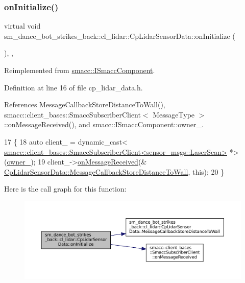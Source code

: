 \subsubsection{\texorpdfstring{on\+Initialize()}{onInitialize()}}
{\footnotesize\ttfamily virtual void sm\+\_\+dance\+\_\+bot\+\_\+strikes\+\_\+back\+::cl\+\_\+lidar\+::\+Cp\+Lidar\+Sensor\+Data\+::on\+Initialize (\begin{DoxyParamCaption}{ }\end{DoxyParamCaption})\hspace{0.3cm}{\ttfamily [inline]}, {\ttfamily [override]}, {\ttfamily [virtual]}}



Reimplemented from \hyperlink{classsmacc_1_1ISmaccComponent_ae6f71d008db12553912e9436184b9e65}{smacc\+::\+I\+Smacc\+Component}.



Definition at line 16 of file cp\+\_\+lidar\+\_\+data.\+h.



References Message\+Callback\+Store\+Distance\+To\+Wall(), smacc\+::client\+\_\+bases\+::\+Smacc\+Subscriber\+Client$<$ Message\+Type $>$\+::on\+Message\+Received(), and smacc\+::\+I\+Smacc\+Component\+::owner\+\_\+.


\begin{DoxyCode}
17   \{
18     \textcolor{keyword}{auto} client\_ = \textcolor{keyword}{dynamic\_cast<}
      \hyperlink{classsmacc_1_1client__bases_1_1SmaccSubscriberClient}{smacc::client\_bases::SmaccSubscriberClient<sensor\_msgs::LaserScan>}
       *\textcolor{keyword}{>}(\hyperlink{classsmacc_1_1ISmaccComponent_a909590e672450ce0eb0d8facb45c737a}{owner\_});
19     client\_->\hyperlink{classsmacc_1_1client__bases_1_1SmaccSubscriberClient_a4f02251e3a161fb6d802b154b1081f18}{onMessageReceived}(&
      \hyperlink{classsm__dance__bot__strikes__back_1_1cl__lidar_1_1CpLidarSensorData_aefe481c1441305a6adf5266c49d941a4}{CpLidarSensorData::MessageCallbackStoreDistanceToWall},
       \textcolor{keyword}{this});
20   \}
\end{DoxyCode}
Here is the call graph for this function\+:
\nopagebreak
\begin{figure}[H]
\begin{center}
\leavevmode
\includegraphics[width=350pt]{classsm__dance__bot__strikes__back_1_1cl__lidar_1_1CpLidarSensorData_a138dad9a855d5d4962410374d0a29d30_cgraph}
\end{center}
\end{figure}


